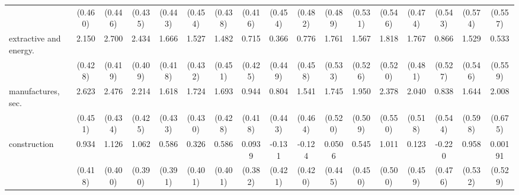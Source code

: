 {\begin{tabular}{l*{16}{c}}
                    &     (0.460)         &     (0.446)         &     (0.435)         &     (0.443)         &     (0.454)         &     (0.438)         &     (0.416)         &     (0.454)         &     (0.482)         &     (0.489)         &     (0.531)         &     (0.546)         &     (0.474)         &     (0.543)         &     (0.574)         &     (0.557)         \\
[1em]
extractive and energy.&       2.150\sym{***}&       2.700\sym{***}&       2.434\sym{***}&       1.666\sym{***}&       1.527\sym{***}&       1.482\sym{**} &       0.715         &       0.366         &       0.776         &       1.761\sym{***}&       1.567\sym{**} &       1.818\sym{***}&       1.767\sym{***}&       0.866         &       1.529\sym{**} &       0.533         \\
                    &     (0.428)         &     (0.419)         &     (0.409)         &     (0.418)         &     (0.432)         &     (0.451)         &     (0.425)         &     (0.449)         &     (0.458)         &     (0.533)         &     (0.526)         &     (0.520)         &     (0.481)         &     (0.527)         &     (0.546)         &     (0.559)         \\
[1em]
manufactures, sec.  &       2.623\sym{***}&       2.476\sym{***}&       2.214\sym{***}&       1.618\sym{***}&       1.724\sym{***}&       1.693\sym{***}&       0.944\sym{*}  &       0.804         &       1.541\sym{***}&       1.745\sym{***}&       1.950\sym{***}&       2.378\sym{***}&       2.040\sym{***}&       0.838         &       1.644\sym{**} &       2.008\sym{**} \\
                    &     (0.451)         &     (0.434)         &     (0.425)         &     (0.433)         &     (0.430)         &     (0.428)         &     (0.418)         &     (0.443)         &     (0.464)         &     (0.520)         &     (0.509)         &     (0.550)         &     (0.518)         &     (0.544)         &     (0.598)         &     (0.675)         \\
[1em]
construction        &       0.934\sym{*}  &       1.126\sym{**} &       1.062\sym{**} &       0.586         &       0.326         &       0.586         &      0.0939         &      -0.131         &      -0.124         &      0.0506         &       0.545         &       1.011\sym{*}  &       0.123         &      -0.220         &       0.958         &     0.00191         \\
                    &     (0.418)         &     (0.400)         &     (0.390)         &     (0.391)         &     (0.401)         &     (0.401)         &     (0.382)         &     (0.421)         &     (0.420)         &     (0.445)         &     (0.450)         &     (0.500)         &     (0.459)         &     (0.476)         &     (0.532)         &     (0.529)         \\

\end{tabular}}
